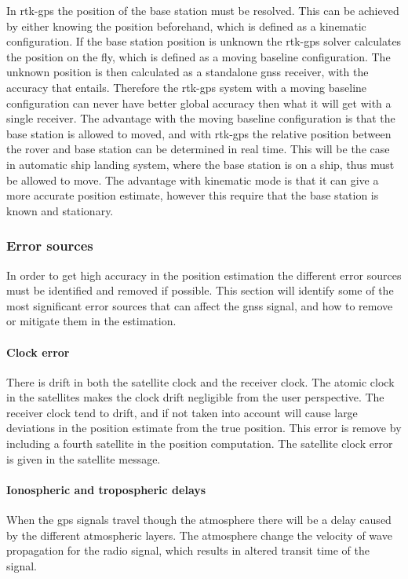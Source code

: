 In \gls{rtk-gps} the position of the base station must be resolved. This can be achieved by either knowing the position beforehand, which is defined as a kinematic configuration. If the base station position is unknown the \gls{rtk-gps} solver calculates the position on the fly, which is defined as a moving baseline configuration. The unknown position is then calculated as a standalone \gls{gnss} receiver, with the accuracy that entails. Therefore the \gls{rtk-gps} system with a moving baseline configuration can never have better global accuracy then what it will get with a single receiver. The advantage with the moving baseline configuration is that the base station is allowed to moved, and with \gls{rtk-gps} the relative position between the rover and base station can be determined in real time. This will be the case in automatic ship landing system, where the base station is on a ship, thus must be allowed to move. The advantage with kinematic mode is that it can give a more accurate position estimate, however this require that the base station is known and stationary.
\subsubsection{Error sources}
In order to get high accuracy in the position estimation the different error sources must be identified and removed if possible. This section will identify some of the most significant error sources that can affect the \gls{gnss} signal, and how to remove or mitigate them in the estimation.
\paragraph{Clock error}
There is drift in both the satellite clock and the receiver clock. The atomic clock in the satellites makes the clock drift negligible from the user perspective. The receiver clock tend to drift, and if not taken into account will cause large deviations in the position estimate from the true position. This error is remove by including a fourth satellite in the position computation. The satellite clock error is given in the satellite message. 

\paragraph{Ionospheric and tropospheric delays}\label{Ss:Atmosphere}
When the \gls{gps} signals travel though the atmosphere there will be a delay caused by the different atmospheric layers. The atmosphere change the velocity of wave propagation for the radio signal, which results in altered transit time of the signal.
